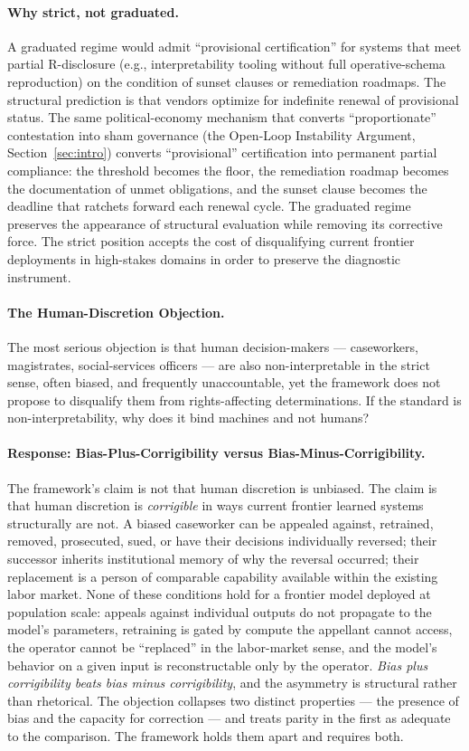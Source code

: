 \documentclass{article}
\theoremstyle{definition}
\begin{document}
\paragraph{Why strict, not graduated.} A graduated regime would admit ``provisional certification'' for systems that meet partial R-disclosure (e.g., interpretability tooling without full operative-schema reproduction) on the condition of sunset clauses or remediation roadmaps. The structural prediction is that vendors optimize for indefinite renewal of provisional status. The same political-economy mechanism that converts ``proportionate'' contestation into sham governance (the Open-Loop Instability Argument, Section~\ref{sec:intro}) converts ``provisional'' certification into permanent partial compliance: the threshold becomes the floor, the remediation roadmap becomes the documentation of unmet obligations, and the sunset clause becomes the deadline that ratchets forward each renewal cycle. The graduated regime preserves the appearance of structural evaluation while removing its corrective force. The strict position accepts the cost of disqualifying current frontier deployments in high-stakes domains in order to preserve the diagnostic instrument.

\paragraph{The Human-Discretion Objection.} The most serious objection is that human decision-makers --- caseworkers, magistrates, social-services officers --- are also non-interpretable in the strict sense, often biased, and frequently unaccountable, yet the framework does not propose to disqualify them from rights-affecting determinations. If the standard is non-interpretability, why does it bind machines and not humans?

\paragraph{Response: Bias-Plus-Corrigibility versus Bias-Minus-Corrigibility.} The framework's claim is not that human discretion is unbiased. The claim is that human discretion is \textit{corrigible} in ways current frontier learned systems structurally are not. A biased caseworker can be appealed against, retrained, removed, prosecuted, sued, or have their decisions individually reversed; their successor inherits institutional memory of why the reversal occurred; their replacement is a person of comparable capability available within the existing labor market. None of these conditions hold for a frontier model deployed at population scale: appeals against individual outputs do not propagate to the model's parameters, retraining is gated by compute the appellant cannot access, the operator cannot be ``replaced'' in the labor-market sense, and the model's behavior on a given input is reconstructable only by the operator. \textit{Bias plus corrigibility beats bias minus corrigibility}, and the asymmetry is structural rather than rhetorical. The objection collapses two distinct properties --- the presence of bias and the capacity for correction --- and treats parity in the first as adequate to the comparison. The framework holds them apart and requires both.
\end{document}
